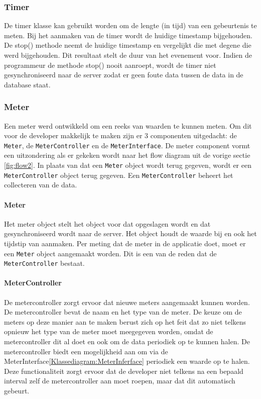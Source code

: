 \subsubsection{Timer}
De timer klasse kan gebruikt worden om de lengte (in tijd) van een gebeurtenis te meten. Bij het aanmaken van de timer wordt de huidige timestamp bijgehouden. De stop() methode neemt de huidige timestamp en vergelijkt die met degene die werd bijgehouden. Dit resultaat stelt de duur van het evenement voor. Indien de programmeur de methode stop() nooit aanroept, wordt de timer niet gesynchroniseerd naar de server zodat er geen foute data tussen de data in de database staat. 

\subsubsection{Meter}
Een meter werd ontwikkeld om een reeks van waarden te kunnen meten. Om dit voor de developer makkelijk te maken zijn er  3 componenten uitgedacht: de \texttt{Meter}, de \texttt{MeterController} en de \texttt{MeterInterface}. De meter component vormt een uitzondering als er gekeken wordt naar het flow diagram uit de vorige sectie \ref{fig:flow2}. In plaats van dat een \texttt{Meter} object wordt terug gegeven, wordt er een \texttt{MeterController} object terug gegeven. Een \texttt{MeterController} beheert het collecteren van de data. 

\paragraph{Meter}
Het meter object stelt het object voor  dat opgeslagen wordt en dat gesynchroniseerd wordt naar de server. Het object houdt de waarde bij en ook het tijdstip van aanmaken. Per meting dat de meter in de applicatie doet, moet er een \texttt{Meter} object aangemaakt worden. Dit is een van de reden dat de \texttt{MeterController} bestaat. 

\paragraph{MeterController}
De metercontroller zorgt ervoor dat nieuwe meters aangemaakt kunnen worden. De metercontroller bevat de naam en het type van de meter. De keuze om de meters op deze manier aan te maken berust zich op het feit dat zo niet telkens opnieuw het type van de meter moet meegegeven worden, omdat de metercontroller dit al doet en ook om de data periodiek op te kunnen halen. De metercontroller biedt een mogelijkheid aan om via de MeterInterface\ref{Klassediagram:MeterInferface} periodiek een waarde op te halen. Deze functionaliteit zorgt ervoor dat de developer niet telkens na een bepaald interval zelf de metercontroller aan moet roepen, maar dat dit automatisch gebeurt.

